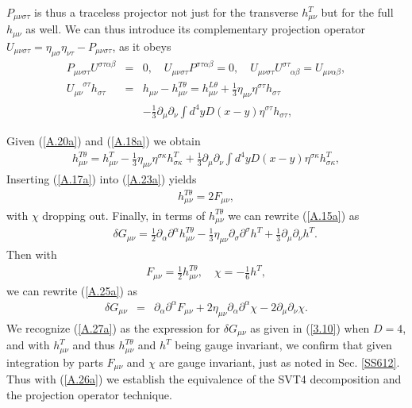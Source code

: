 %
$P_{\mu\nu\sigma\tau}$ is thus a traceless projector not just for the transverse $h_{\mu\nu}^T$ but for the full $h_{\mu\nu}$ as well. We can thus introduce its complementary projection operator $U_{\mu\nu\sigma\tau}=\eta_{\mu\sigma}\eta_{\nu\tau}-P_{\mu\nu\sigma\tau}$, as it obeys
%
\begin{eqnarray}
P_{\mu\nu\sigma\tau}U^{\sigma\tau\alpha\beta}&=&0,\quad
U_{\mu\nu\sigma\tau}P^{\sigma\tau\alpha\beta}=0,\quad
U_{\mu\nu\sigma\tau}U^{\sigma\tau}_{\phantom{\sigma\tau}\alpha\beta}
=U_{\mu\nu\alpha\beta},
\nonumber\\
U_{\mu\nu}^{\phantom{\mu\nu}\sigma\tau}h_{\sigma\tau}&=&h_{\mu\nu}-h^{T\theta}_{\mu\nu}=
h^{L\theta}_{\mu\nu}+\frac{1}{3}\eta_{\mu\nu}\eta^{\sigma\tau}h_{\sigma\tau} 
\nonumber\\
&&
-\frac{1}{3}\partial_{\mu}\partial_{\nu}\int d^4y D(x-y)\eta^{\sigma\tau}h_{\sigma\tau},
\label{A.22a}
\end{eqnarray}
% 

Given (\ref{A.20a}) and (\ref{A.18a}) we obtain 
%
\begin{eqnarray}
h^{T\theta}_{\mu\nu}= h^{T}_{\mu\nu}-\frac{1}{3}\eta_{\mu\nu}\eta^{\sigma\kappa}h^{T}_{\sigma\kappa}
+\frac{1}{3}\partial_{\mu}\partial_{\nu}\int d^4y D(x-y)\eta^{\sigma\kappa}h^{T}_{\sigma\kappa},
\label{A.23a}
\end{eqnarray}
%
Inserting (\ref{A.17a}) into (\ref{A.23a}) yields
%
\begin{eqnarray}
h^{T\theta}_{\mu\nu}=2F_{\mu\nu},
\label{A.24a}
\end{eqnarray}
%
with $\chi$ dropping out. Finally, in terms of $h^{T\theta}_{\mu\nu}$ we can rewrite (\ref{A.15a}) as 
%
\begin{eqnarray}
&&\delta G_{\mu\nu}=
\tfrac{1}{2}\partial_{\alpha}\partial^{\alpha}h_{\mu\nu}^{T\theta}
-\tfrac{1}{3}\eta_{\mu\nu}\partial_{\sigma}\partial^{\sigma}h^{T}
+\tfrac{1}{3}\partial_{\mu}\partial_{\nu}h^{T}.
\label{A.25a}
\end{eqnarray}
%
Then with 
%
\begin{eqnarray}
F_{\mu\nu}=\tfrac{1}{2}h_{\mu\nu}^{T\theta}, \quad \chi=-\tfrac{1}{6}h^{T},
\label{A.26a}
\end{eqnarray}
%
we can rewrite (\ref{A.25a}) as 
%
\begin{eqnarray}
\delta G_{\mu\nu}&=&\partial_{\alpha}\partial^{\alpha}F_{\mu\nu}+2\eta_{\mu\nu}\partial_{\alpha}\partial^{\alpha}\chi-2\partial_{\mu}\partial_{\nu}\chi.
\label{A.27a}
\end{eqnarray}
%
We recognize (\ref{A.27a}) as the expression for $\delta G_{\mu\nu}$ as given in (\ref{3.10}) when $D=4$, and with $h^T_{\mu\nu}$ and thus $h^{T\theta}_{\mu\nu}$ and $h^T$ being gauge invariant, we confirm that given integration by parts $F_{\mu\nu}$ and $\chi$ are gauge invariant, just as noted in Sec. \ref{SS612}. Thus with (\ref{A.26a})
we establish the equivalence of the  SVT4 decomposition and the projection operator technique.

